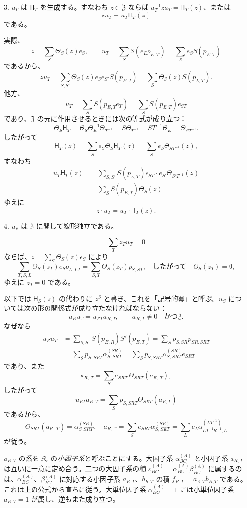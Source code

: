 3. \(u_T\) は \(\mathsf{H}_T\) を生成する。すなわち \(z\in\mathfrak Z\) ならば \(u_T^{-1}zu_T=\mathsf{H}_T(z)\)、または
\[
z u_T=u_T \mathsf{H}_T(z)
\]
である。

実際、
\[
z=\sum_S\Theta_S(z)e_S,\qquad
u_T=\sum_S S(e_Ep_{E,T})=\sum_S e_S S(p_{E,T})
\]
であるから、
\[
zu_T=\sum_{S,S'}\Theta_S(z)e_Se_{S'}S(p_{E,T})
=\sum_S\Theta_S(z)S(p_{E,T}).
\]
他方、
\[
u_T=\sum_S S(p_{E,T}e_T)=\sum_S S(p_{E,T})e_{ST}
\]
であり、\(\mathfrak Z\) の元に作用させるときには次の等式が成り立つ：
\[
\Theta_S \mathsf{H}_T=\Theta_S\Theta_E^{-1}\Theta_{T^{-1}}
=S\Theta_{T^{-1}}=ST^{-1}\Theta_E=\Theta_{ST^{-1}}.
\]
したがって
\[
\mathsf{H}_T(z)=\sum_S e_S\Theta_S \mathsf{H}_T(z)=\sum_S e_S\Theta_{ST^{-1}}(z),
\]
すなわち
\[
\begin{aligned}
u_T\mathsf{H}_T(z)
&=\sum_{S,S'} S(p_{E,T})e_{ST}\cdot e_{S'}\Theta_{S'T^{-1}}(z)\\
&=\sum_S S(p_{E,T})\Theta_S(z)
\end{aligned}
\]
ゆえに
\[
z\cdot u_T=u_T\cdot \mathsf{H}_T(z).
\]

4. \(u_S\) は \(\mathfrak Z\) に関して線形独立である。

\[
\sum_T z_Tu_T=0
\]
ならば、\(z=\sum_S\Theta_S(z)e_S\) により
\[
\sum_{T,S,L}\Theta_S(z_T)e_Sp_{L,LT}
=\sum_{S,T}\Theta_S(z_T)p_{S,ST},
\quad\text{したがって}\quad
\Theta_S(z_T)=0,
\]
ゆえに \(z_T=0\) である。

以下では \(\mathsf{H}_S(z)\) の代わりに \(z^S\) と書き、これを「記号的冪」と呼ぶ。\(u_S\) については次の形の関係式が成り立たなければならない：
\[
u_Ru_T=u_{RT}a_{R,T},\qquad a_{R,T}\ne0\quad\text{かつ}\mathfrak Z.
\]
なぜなら
\[
\begin{aligned}
u_Ru_T
&=\sum_{S,S'} S(p_{E,R})S'(p_{E,T})
=\sum_S p_{S,SR}p_{SR,SRT}\\
&=\sum_S p_{S,SRT}\alpha_{S,SRT}^{(SR)}
=\sum_S p_{S,SRT}\alpha_{S,SRT}^{(SR)}e_{SRT}
\end{aligned}
\]
であり、また
\[
a_{R,\,T}=\sum_S e_{SRT}\,\Theta_{SRT}\left(a_{R,\,T}\right),
\]
したがって
\[
u_{RT}a_{R,T}=\sum_S p_{S,SRT}\Theta_{SRT}(a_{R,T})
\]
であるから、
\[
\Theta_{SRT}(a_{R,\,T})=\alpha_{S,SRT}^{(SR)},
\quad
a_{R,\,T}=\sum_S e_{SRT}\alpha_{S,SRT}^{(SR)}
=\sum_L e_L\alpha_{LT^{-1}R^{-1},L}^{(LT^{-1})}
\]
が従う。

\(a_{R,T}\) の系を \(\mathfrak K_r\) の\emph{小因子系}と呼ぶことにする。大因子系 \(\alpha_{BC}^{(A)}\) と小因子系 \(a_{R,T}\) は互いに一意に定め合う。二つの大因子系の積 \(\varepsilon_{BC}^{(A)}=\alpha_{BC}^{(A)}\beta_{BC}^{(A)}\) に属するのは、\(\alpha_{BC}^{(A)}\)、\(\beta_{BC}^{(A)}\) に対応する小因子系 \(a_{R,T}\)、\(b_{R,T}\) の積 \(f_{R,T}=a_{R,T}b_{R,T}\) である。これは上の公式から直ちに従う。大単位因子系 \(\alpha_{BC}^{(A)}=1\) には小単位因子系 \(a_{R,T}=1\) が属し、逆もまた成り立つ。

